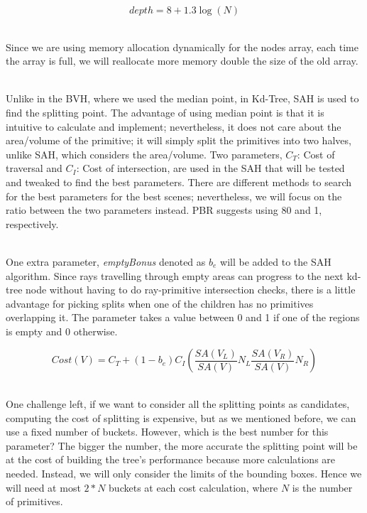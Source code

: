 \documentclass[11pt,a4paper]{article}
\begin{document}
\begin{equation}
depth = 8 + 1.3\log(N)
\label{eq:depth}
\end{equation}

\noindent
\\
Since we are using memory allocation dynamically for the nodes array, each time the array is full, we will reallocate more memory double the size of the old array.

\noindent
\\
Unlike in the BVH, where we used the median point, in Kd-Tree, SAH is used to find the splitting point. The advantage of using median point is that it is intuitive to calculate and implement; nevertheless, it does not care about the area/volume of the primitive; it will simply split the primitives into two halves, unlike SAH, which considers the area/volume. Two parameters, $C_T$: Cost of traversal and $C_I$: Cost of intersection, are used in the SAH that will be tested and tweaked to find the best parameters. There are different methods to search for the best parameters for the best scenes; nevertheless, we will focus on the ratio between the two parameters instead. PBR suggests using 80 and 1, respectively.


\noindent
\\
One extra parameter, \textit{emptyBonus} denoted as $b_e$ will be added to the SAH algorithm. Since rays travelling through empty areas can progress to the next kd-tree node without having to do ray-primitive intersection checks, there is a little advantage for picking splits when one of the children has no primitives overlapping it. The parameter takes a value between 0 and 1 if one of the regions is empty and 0 otherwise. 



\begin{equation}
Cost(V) = C_T + (1-b_e)C_I(\frac{SA(V_L)}{SA(V)}N_L \frac{SA(V_R)}{SA(V)}N_R)
\end{equation}

\noindent
\\
One challenge left, if we want to consider all the splitting points as candidates, computing the cost of splitting is expensive, but as we mentioned before, we can use a fixed number of buckets. However, which is the best number for this parameter? The bigger the number, the more accurate the splitting point will be at the cost of building the tree's performance because more calculations are needed. Instead, we will only consider the limits of the bounding boxes. Hence we will need at most $2 * N$ buckets at each cost calculation, where $N$ is the number of primitives.
\end{document}
